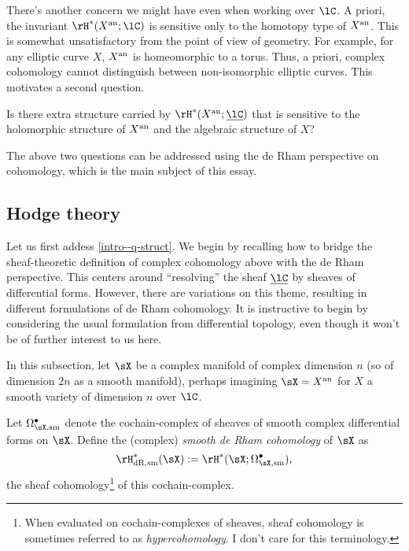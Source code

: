 There's another concern we might have even when working over $\lC$. A priori, the invariant $\rH^*(X^\an;\lC)$ is sensitive only to the homotopy type of $X^{\mathrm{an}}$. This is somewhat unsatisfactory from the point of view of geometry. For example, for any elliptic curve $X$, $X^{\mathrm{an}}$ is homeomorphic to a torus. Thus, a priori, complex cohomology cannot distinguish between non-isomorphic elliptic curves. This motivates a second question.

\begin{question}
  \label{intro--q-struct}
  Is there extra structure carried by $\rH^*(X^\an;\u\lC)$ that is sensitive to the holomorphic structure of $X^{\mathrm{an}}$ and the algebraic structure of $X$?
\end{question}

The above two questions can be addressed using the de Rham perspective on cohomology, which is the main subject of this essay.


\subsection{Hodge theory}
\label{intro--hodge}

Let us first addess \cref{intro--q-struct}. We begin by recalling how to bridge the sheaf-theoretic definition of complex cohomology above with the de Rham perspective. This centers around ``resolving'' the sheaf $\u\lC$ by sheaves of differential forms. However, there are variations on this theme, resulting in different formulations of de Rham cohomology. It is instructive to begin by considering the usual formulation from differential topology, even though it won't be of further interest to us here.

\begin{situation}
  \label{intro--hodge--hyp}
  In this subsection, let $\sX$ be a complex manifold of complex dimension $n$ (so of dimension $2n$ as a smooth manifold), perhaps imagining $\sX = X^\an$ for $X$ a smooth variety of dimension $n$ over $\lC$.
\end{situation}

\begin{definition}
  \label{intro--hodge--smooth-derham}
  Let $\Omega_{\sX,\sm}^\bullet$ denote the cochain-complex of sheaves of smooth complex differential forms on $\sX$. Define the (complex) \emph{smooth de Rham cohomology} of $\sX$ as
  \[
    \rH^*_{\dR,\sm}(\sX) \ce
    \rH^*(\sX;\Omega_{\sX,\sm}^\bullet),
  \]
  the sheaf cohomology\footnote{When evaluated on cochain-complexes of sheaves, sheaf cohomology is sometimes referred to as \emph{hypercohomology}. I don't care for this terminology.} of this cochain-complex.
\end{definition}

